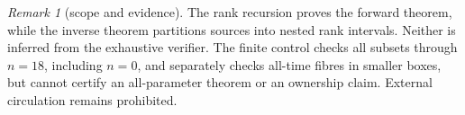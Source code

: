 \documentclass[a4paper,11pt]{amsart}
\theoremstyle{remark}
\newtheorem{remark}[theorem]{Remark}
\begin{document}
\begin{remark}[scope and evidence]
The rank recursion proves the forward theorem, while the inverse theorem
partitions sources into nested rank intervals.  Neither is inferred from the
exhaustive verifier.  The finite control checks all subsets through $n=18$,
including $n=0$, and separately checks all-time fibres in smaller boxes, but
cannot certify an all-parameter theorem or an ownership claim.  External
circulation remains prohibited.
\end{remark}



\end{document}

